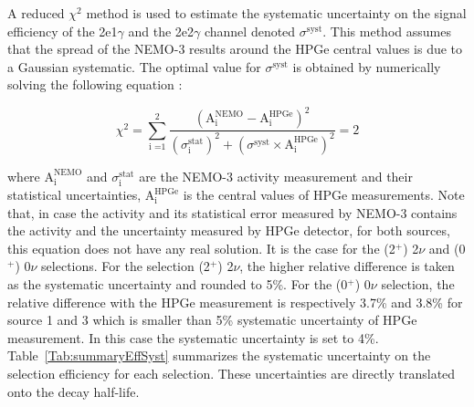 \documentclass[main.tex]{subfiles}
\begin{document}
\FloatBarrier




\bigskip



\NI A reduced $\chi^{\text{2}}$ method is used to estimate the systematic uncertainty on the signal efficiency of the 2e1$\gamma$ and the 2e2$\gamma$ channel denoted $\sigma^{\text{syst}}$. This method assumes that the spread of the NEMO-3 results around the HPGe central values is due to a Gaussian systematic. The optimal value for $\sigma^{\text{syst}}$ is obtained by numerically solving the following equation : 
 

\begin{equation}
\chi^2 = \sum_{\text{i =1}}^{\text{2}} \frac{(\text{A}_\text{i}^{\text{NEMO}} - \text{A}_\text{i}^{\text{HPGe}})^\text{2}} {(\sigma_\text{i}^{\text{stat}})^\text{2} + (\sigma^{\text{syst}} \times \text{A}_\text{i}^{\text{HPGe}})^\text{2}} = \text{2}
\end{equation}


\NI where $\text{A}_\text{i}^{\text{NEMO}}$ and $\sigma_\text{i}^{\text{stat}}$ are the NEMO-3 activity measurement and their statistical uncertainties, $\text{A}_\text{i}^{\text{HPGe}}$ is the central values of HPGe measurements. Note that, in case the activity and its statistical error measured by NEMO-3 contains the activity and the uncertainty measured by HPGe detector, for both sources, this equation does not have any real solution. It is the case for the (2$^+$) 2$\nu$ and (0$^+$) 0$\nu$ selections. For the selection (2$^+$) 2$\nu$, the higher relative difference is taken as the systematic uncertainty and rounded to 5\%. For the (0$^+$) 0$\nu$ selection, the relative difference with the HPGe measurement is respectively 3.7\% and 3.8\% for source 1 and 3 which is smaller than 5\% systematic uncertainty of HPGe measurement. In this case the systematic uncertainty is set to 4\%. Table~\ref{Tab:summaryEffSyst} summarizes the systematic uncertainty on the selection efficiency for each selection. These uncertainties are directly translated onto the decay half-life.
\end{document}
